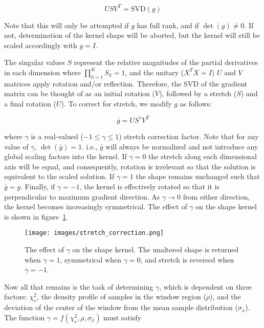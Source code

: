\begin{equation}
    U S V^T = \text{SVD}(g)
    \label{eq:equation53}
\end{equation}

Note that this will only be attempted if $g$ has full rank, and if
$\det(g) \neq 0$.
If not, determination of the kernel shape will be aborted, but the kernel will
still be scaled accordingly with $g = I$.

The singular values $S$ represent the relative magnitudes of the
partial derivatives in each dimension where $\prod_{k=1}^{K}{S_k} = 1$, and
the unitary ($X^T X = I$) $U$ and $V$ matrices apply rotation and/or reflection.
Therefore, the SVD of the gradient matrix can be thought of as an initial
rotation ($V$), followed by a stretch ($S$) and a final rotation ($U$).
To correct for stretch, we modify $g$ as follows:

\begin{equation}
    \bar{g} = U S^{\gamma} V^T
    \label{eq:equation54}
\end{equation}

where $\gamma$ is a real-valued ($-1 \leq \gamma \leq 1$) stretch correction
factor.
Note that for any value of $\gamma$, $\det(\bar{g}) = 1$.
i.e., $\bar{g}$ will always be normalized and not introduce any global scaling
factors into the kernel.
If $\gamma = 0$ the stretch along each dimensional axis will be equal, and
consequently, rotation is irrelevant so that the solution is equivalent to the
scaled solution.
If $\gamma = 1$ the shape remains unchanged such that $\bar{g} = g$.
Finally, if $\gamma = -1$, the kernel is effectively rotated so that it is
perpendicular to maximum gradient direction.
As $\gamma \rightarrow 0$ from either direction, the kernel becomes increasingly
symmetrical.
The effect of $\gamma$ on the shape kernel is shown in
figure~\ref{fig:stretch-correction}.

\begin{figure}[H]
  \begin{center}
  \texttt{[image: images/stretch\_correction.png]}
  \caption{The effect of $\gamma$ on the shape kernel.  The unaltered shape
           is returned when $\gamma=1$, symmetrical when $\gamma=0$, and
           stretch is reversed when $\gamma=-1$.}
  \label{fig:stretch-correction}
  \end{center}
\end{figure}

Now all that remains is the task of determining $\gamma$, which is dependent
on three factors:  $\chi_r^2$, the density profile of samples in the window
region ($\rho$), and the deviation of the center of the window from
the mean sample distribution ($\sigma_{\bar{x}}$).
The function $\gamma = f(\chi_r^2, \rho, \sigma_{\bar{x}})$ must satisfy

